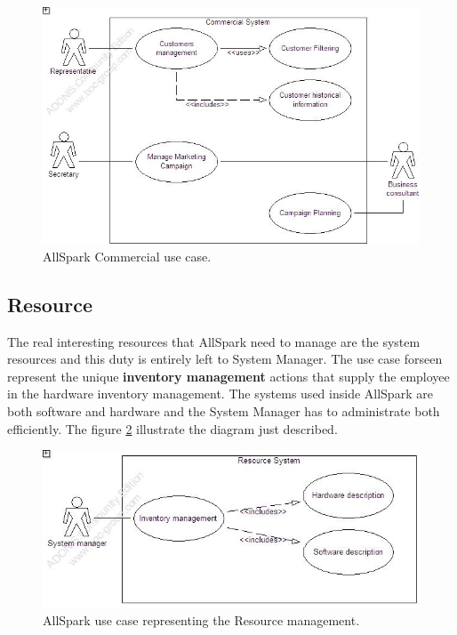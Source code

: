 \begin{figure}
\begin{centering}
\includegraphics[scale=0.45]{assign3/adonis/imgs/commercial.jpg}
\caption{AllSpark Commercial use case.}
\label{3img:[use]commercial}
\end{centering}
\end{figure}


\subsection{Resource}
The real interesting resources that AllSpark need to manage are the system resources and this duty is entirely left to System Manager. The use case forseen represent the unique \textbf{inventory management} actions that supply the employee in the hardware inventory management. The systems used inside AllSpark are both software and hardware and the System Manager has to administrate both efficiently. The figure \ref{3img:[use]resource} illustrate the diagram just described.

\begin{figure}
\begin{centering}
\includegraphics[scale=0.45]{assign3/adonis/imgs/resource.jpg}
\caption{AllSpark use case representing the Resource management.}
\label{3img:[use]resource}
\end{centering}
\end{figure}


